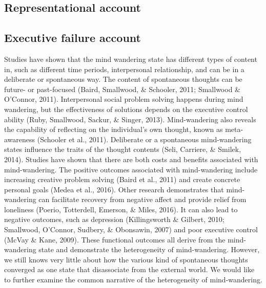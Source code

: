 \subsection{Representational account}

\subsection{Executive failure account}
Studies have shown that the mind wandering state has different types of content in, such as different time periods, interpersonal relationship, and can be in a deliberate or spontaneous way. The content of spontaneous thoughts can be future- or past-focused (Baird, Smallwood, \& Schooler, 2011; Smallwood \& O’Connor, 2011). Interpersonal social problem solving happens during mind wandering, but the effectiveness of solutions depends on the executive control ability (Ruby, Smallwood, Sackur, \& Singer, 2013). Mind-wandering also reveals the capability of reflecting on the individual’s own thought, known as meta-awareness (Schooler et al., 2011). Deliberate or a spontaneous mind-wandering states influence the traits of the thought contents (Seli, Carriere, \& Smilek, 2014). Studies have shown that there are both costs and benefits associated with mind-wandering. The positive outcomes associated with mind-wandering include increasing creative problem solving (Baird et al., 2011) and create concrete personal goals (Medea et al., 2016). Other research demonstrates that mind-wandering can facilitate recovery from negative affect \cite{Ruby2013a} and provide relief from loneliness (Poerio, Totterdell, Emerson, \& Miles, 2016). It can also lead to negative outcomes, such as depression (Killingsworth \& Gilbert, 2010; Smallwood, O’Connor, Sudbery, \& Obonsawin, 2007) and poor executive control (McVay \& Kane, 2009). These functional outcomes all derive from the mind-wandering state and demonstrate the heterogeneity of mind-wandering. However, we still knows very little about how the various kind of spontaneous thoughts converged as one state that disassociate from the external world. We would like to further examine the common narrative of the heterogeneity of mind-wandering.  
